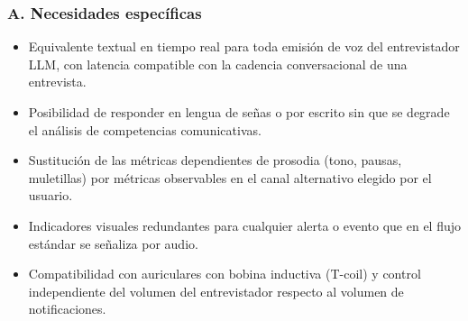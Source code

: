 \subsubsection*{A. Necesidades específicas}
\begin{itemize}
  \item Equivalente textual en tiempo real para toda emisión de voz del
        entrevistador LLM, con latencia compatible con la cadencia
        conversacional de una entrevista.
  \item Posibilidad de responder en lengua de señas o por escrito sin
        que se degrade el análisis de competencias comunicativas.
  \item Sustitución de las métricas dependientes de prosodia (tono,
        pausas, muletillas) por métricas observables en el canal
        alternativo elegido por el usuario.
  \item Indicadores visuales redundantes para cualquier alerta o
        evento que en el flujo estándar se señaliza por audio.
  \item Compatibilidad con auriculares con bobina inductiva (T-coil) y
        control independiente del volumen del entrevistador respecto al
        volumen de notificaciones.
\end{itemize}

